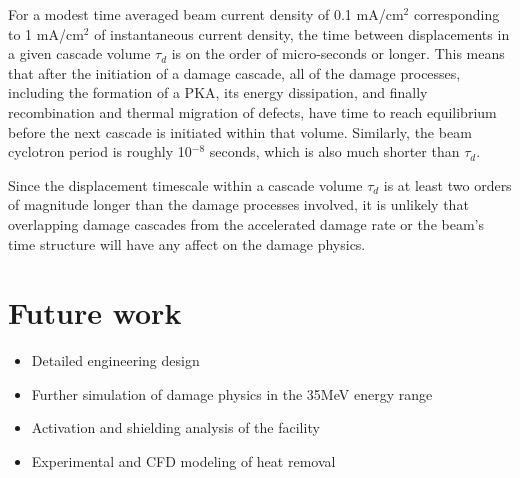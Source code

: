 \documentclass[final,3p,times,twocolumn]{elsarticle} %
\begin{document}
For a modest time averaged beam current density of 0.1 mA/cm$^2$ corresponding to 1 mA/cm$^2$ of instantaneous current density, the time between displacements in a given cascade volume $\tau_d$ is on the order of micro-seconds or longer.  This means that after the initiation of a damage cascade, all of the damage processes, including the formation of a PKA, its energy dissipation, and finally recombination and thermal migration of defects, have time to reach equilibrium before the next cascade is initiated within that volume.  Similarly, the beam cyclotron period is roughly 10$^{-8}$ seconds, which is also much shorter than $\tau_d$.  

Since the displacement timescale within a cascade volume $\tau_d$ is at least two orders of magnitude longer than the damage processes involved, it is unlikely that overlapping damage cascades from the accelerated damage rate or the beam's time structure will have any affect on the damage physics.

%
%



\section{Future work}

\begin{itemize}
\item Detailed engineering design
\item Further simulation of damage physics in the 35MeV energy range
\item Activation and shielding analysis of the facility
\item Experimental and CFD modeling of heat removal 
\end{itemize}
\end{document}
